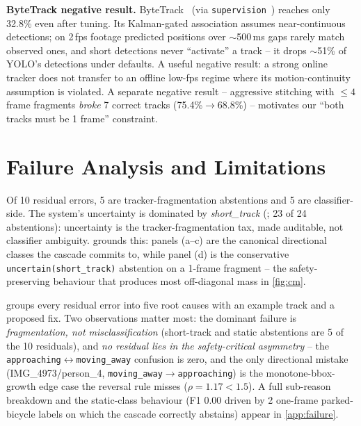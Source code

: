 \documentclass[10pt,twocolumn,letterpaper]{article}
\begin{document}
\noindent\textbf{ByteTrack negative result.}
\label{sec:bytetrack}
ByteTrack~\cite{bytetrack} (via \texttt{supervision}~\cite{supervision})
reaches only 32.8\% even after tuning. Its Kalman-gated
association assumes near-continuous detections; on 2\,fps footage
predicted positions over $\sim$500\,ms gaps rarely match observed
ones, and short detections never ``activate'' a track -- it drops
$\sim$51\% of YOLO's detections under defaults. A useful negative
result: a strong online tracker does not transfer to an offline
low-fps regime where its motion-continuity assumption is violated.
A separate negative result -- aggressive stitching with $\le\!4$
frame fragments \emph{broke} 7 correct tracks (75.4\%$\to$68.8\%) --
motivates our ``both tracks must be 1 frame'' constraint.

\section{Failure Analysis and Limitations}
\label{sec:failure}

Of 10 residual errors, 5 are tracker-fragmentation abstentions and 5
are classifier-side. The system's uncertainty is dominated by
\emph{short\_track} (; 23 of 24 abstentions):
uncertainty is the tracker-fragmentation tax, made auditable, not
classifier ambiguity.
 grounds this: panels (a--c) are the canonical
directional classes the cascade commits to, while panel (d) is the
conservative \texttt{uncertain(short\_track)} abstention on a 1-frame
fragment -- the safety-preserving behaviour that produces most
off-diagonal mass in \cref{fig:cm}.

 groups every residual error into five root causes
with an example track and a proposed fix. Two observations matter most:
the dominant failure is \emph{fragmentation, not misclassification}
(short-track and static abstentions are 5 of the 10 residuals), and
\emph{no residual lies in the safety-critical asymmetry} -- the
\texttt{approaching}$\leftrightarrow$\texttt{moving\_away} confusion is
zero, and the only directional mistake (IMG\_4973/person\_4,
\texttt{moving\_away}$\to$\texttt{approaching}) is the
monotone-bbox-growth edge case the reversal rule misses
($\rho\!=\!1.17<1.5$). A full sub-reason breakdown and the static-class
behaviour (F1 0.00 driven by 2 one-frame parked-bicycle labels on which
the cascade correctly abstains) appear in \cref{app:failure}.
\end{document}
